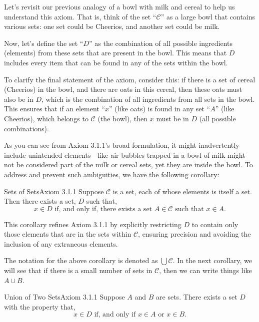 Let's revisit our previous analogy of a bowl with milk and cereal to help us understand this axiom. That is, think of the set ``\(\mathcal{C}\)'' as a large bowl that contains various sets: one set could be Cheerios, and another set could be milk.

Now, let's define the set ``\(D\)'' as the combination of all possible ingredients (elements) from these sets that are present in the bowl. This means that \(D\) includes every item that can be found in any of the sets within the bowl.

To clarify the final statement of the axiom, consider this: if there is a set of cereal (Cheerios) in the bowl, and there are oats in this cereal, then these oats must also be in \(D\), which is the combination of all ingredients from all sets in the bowl. This ensures that if an element ``\(x\)'' (like oats) is found in any set ``\(A\)'' (like Cheerios), which belongs to \(\mathcal{C}\) (the bowl), then \(x\) must be in \(D\) (all possible combinations). 

As you can see from Axiom 3.1.1's broad formulation, it might inadvertently include unintended elements---like air bubbles trapped in a bowl of milk might not be considered part of the milk or cereal sets, yet they are inside the bowl. To address and prevent such ambiguities, we have the following corollary:

\begin{corollary}
    {Sets of Sets}{Axiom 3.1.1} Suppose \(\mathcal{C}\) is a set, each of whose elements is itself a set. Then there exists a set, \(D\) such that, \[x \in D \text{ if, and only if, there exists a set } A \in \mathcal{C} \text{ such that } x \in A.\]
\end{corollary}

This corollary refines Axiom 3.1.1 by explicitly restricting \(D\) to contain only those elements that are in the sets within \(\mathcal{C}\), ensuring precision and avoiding the inclusion of any extraneous elements. 

The notation for the above corollary is denoted as \(\bigcup \mathcal{C}\). In the next corollary, we will see that if there is a small number of sets in \(\mathcal{C}\), then we can write things like \(A\cup B\).

\begin{corollary}
    {Union of Two Sets}{Axiom 3.1.1} Suppose \(A\) and \(B\) are sets. There exists a set \(D\) with the property that, \[x \in D \text{ if, and only if } x \in A \text{ or } x \in B.\]
\end{corollary}

